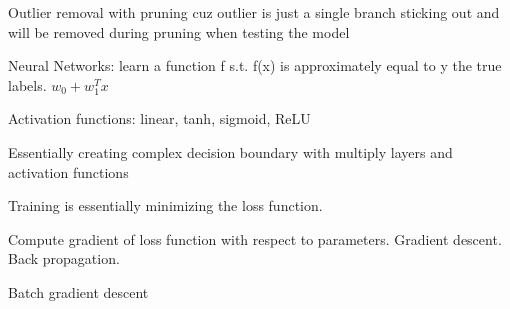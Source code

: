 \documentclass{article}
\begin{document}
Outlier removal with pruning cuz outlier is just a single branch sticking out and will be removed during pruning when testing the model



Neural Networks:
learn a function f s.t. f(x) is approximately equal to y the true labels.
$w_0 + w_1^Tx$

Activation functions: linear, tanh, sigmoid, ReLU

Essentially creating complex decision boundary with multiply layers and activation functions

Training is essentially minimizing the loss function.

Compute gradient of loss function with respect to parameters. Gradient descent. Back propagation.

Batch gradient descent
\end{document}

